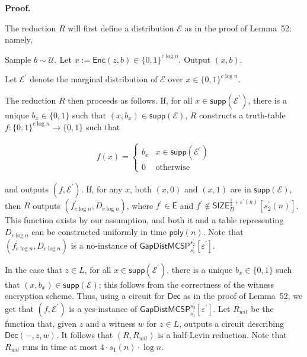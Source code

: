 


\par\medskip\noindent\textbf{Proof.}\par




The reduction $R$ will first define a distribution $\mathcal{E}$ as in the proof of Lemma 52: namely,\par



Sample $b\sim\mathcal{U}$. Let $x:={\mathsf{Enc}}(z,b)\in\{0,1\}^{c\log n}$. Output $(x,b)$.\par



Let $\mathcal{E}^{\prime}$ denote the marginal distribution of $\mathcal{E}$ over $x\in\{0,1\}^{c\log n}$.\par




The reduction $R$ then proceeds as follows. If, for all $x\in{\mathsf{supp}}(\mathcal{E}^{\prime})$, there is a unique $b_{x}\in\{0,1\}$ such that $(x,b_{x})\in{\mathsf{supp}}(\mathcal{E})$, $R$ constructs a truth-table $f:\{0,1\}^{c\log n}\to\{0,1\}$ such that\par


\[\begin{gathered}
f(x)=\begin{cases}b_{x}&x\in{\mathsf{supp}}(\mathcal{E}^{\prime})\\
0&\text{otherwise}\end{cases}
\end{gathered}\]


and outputs $(f,\mathcal{E}^{\prime})$. If, for any $x$, both $(x,0)$ and $(x,1)$ are in ${\mathsf{supp}}(\mathcal{E})$, then $R$ outputs $(f^{\prime}_{c\log n},D_{c\log n})$, where $f^{\prime}\in{\mathsf{E}}$ and $f^{\prime}\notin{\mathsf{SIZE}}_{D}^{\frac{1}{2}+\varepsilon^{\prime}(n)}[s_{2}^{\prime}(n)]$. This function exists by our assumption, and both it and a table representing $D_{c\log n}$ can be constructed uniformly in time ${\mathsf{poly}}(n)$. Note that $(f_{c\log n}^{\prime},D_{c\log n})$ is a no-instance of ${\mathsf{GapDistMCSP}}_{s_{1}^{\prime}}^{s_{2}^{\prime}}[\varepsilon^{\prime}]$.\par




In the case that $z\in L$, for all $x\in{\mathsf{supp}}(\mathcal{E}^{\prime})$, there is a unique $b_{x}\in\{0,1\}$ such that $(x,b_{x})\in{\mathsf{supp}}(\mathcal{E})$; this follows from the correctness of the witness encryption scheme. Thus, using a circuit for ${\mathsf{Dec}}$ as in the proof of Lemma 52, we get that $(f,\mathcal{E}^{\prime})$ is a yes-instance of ${\mathsf{GapDistMCSP}}_{s_{1}^{\prime}}^{s_{2}^{\prime}}[\varepsilon^{\prime}]$. Let $R_{wit}$ be the function that, given $z$ and a witness $w$ for $z\in L$, outputs a circuit describing ${\mathsf{Dec}}(-,z,w)$. It follows that $(R,R_{wit})$ is a half-Levin reduction. Note that $R_{wit}$ runs in time at most $4\cdot s_{1}(n)\cdot\log n$.\par




